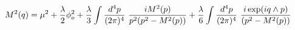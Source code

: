 \begin{equation}
\label{ventinove}
M^2(q)= \mu ^2 + {\lambda \over 2} \phi _o^2    + {\lambda \over 3}\int \frac {d^4 p}{(2\pi)^4} ~ {i M^2(p) 
\over {{p^2} (p^2 - M^2(p))}}
+ {\lambda \over 6} \int \frac {d^4 p}{(2\pi)^4} ~ {  i  \exp (i  q \wedge p)  \over { (p^2 - M^2(p))}} 
\end{equation}

